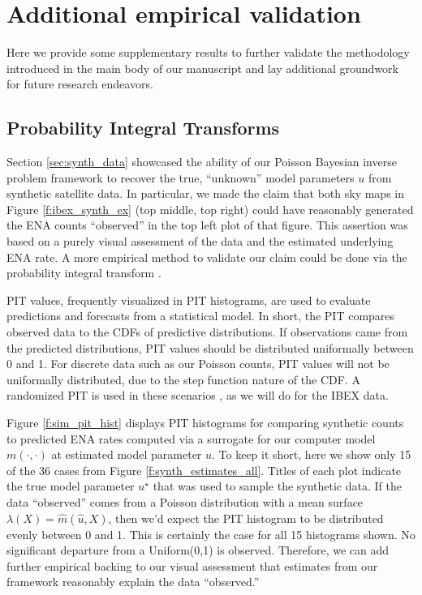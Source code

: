 \documentclass[11pt]{article}
\begin{document}



\appendix

\section{Additional empirical validation}

Here we provide some supplementary results to further validate the methodology
introduced in the main body of our manuscript and lay additional groundwork
for future research endeavors.

\subsection{Probability Integral Transforms}
\label{app:pits}

Section \ref{sec:synth_data} showcased the ability of our Poisson Bayesian
inverse problem framework to recover the {\color{red}true, ``unknown''} model
parameters $u$ from synthetic satellite data. In particular, we made the claim
that both sky maps in Figure \ref{f:ibex_synth_ex} (top middle, top right)
could have reasonably generated the ENA counts ``observed'' in the top left
plot of that figure. This assertion was based on a purely visual assessment of
the data and the estimated underlying ENA rate. A more empirical method to
validate our claim could be done via the probability integral transform
\citep[PIT;][]{gneiting2007probabilistic,diebold1997evaluating,dawid1984present}.

PIT values, frequently visualized in PIT histograms, are used to evaluate
predictions and forecasts from a statistical model. In short, the PIT compares
observed data to the CDFs of predictive distributions. If observations came
from the predicted distributions, PIT values should be distributed uniformally
between 0 and 1. For discrete data such as our Poisson counts, PIT values will
not be uniformally distributed, due to the step function nature of the CDF. A
randomized PIT is used in these scenarios
\citep{gneiting2014probabilistic,czado2009predictive}, as we will do for the
IBEX data.

Figure \ref{f:sim_pit_hist} displays PIT histograms for comparing synthetic
counts to predicted ENA rates computed via a surrogate for our computer model
$m(\cdot,\cdot)$ at estimated model parameter $\hat{u}$. To keep it short, here
we show only 15 of the 36 cases from Figure \ref{f:synth_estimates_all}. Titles
of each plot indicate the true model parameter $u^\star$ that was used to
sample the synthetic data. If the data ``observed'' comes from a Poisson
distribution with a mean surface $\lambda(X) = \hat{m}(\hat{u}, X)$, then we'd
expect the PIT histogram to be distributed evenly between 0 and 1. This is
certainly the case for all 15 histograms shown.  No significant departure from
a Uniform(0,1) is observed. Therefore, we can add further empirical backing to
our visual assessment that estimates from our framework reasonably explain the
data ``observed.''
\end{document}
